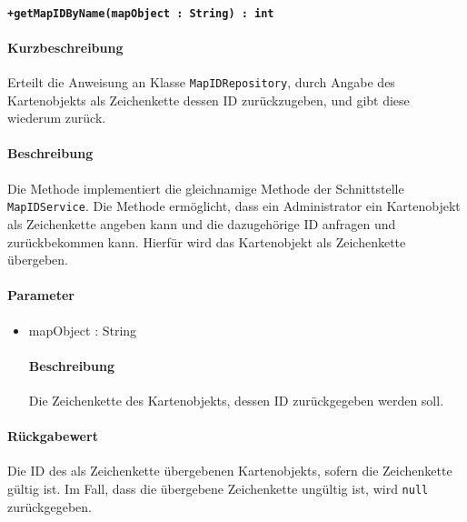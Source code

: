 \paragraph*{\texttt{+getMapIDByName(mapObject : String) : int}}%
\paragraph*{Kurzbeschreibung}
Erteilt die Anweisung an Klasse \texttt{MapIDRepository}, durch Angabe des Kartenobjekts als Zeichenkette dessen ID zurückzugeben, und gibt diese wiederum zurück.
\paragraph*{Beschreibung}
Die Methode implementiert die gleichnamige Methode der Schnittstelle \texttt{MapIDService}.
Die Methode ermöglicht, dass ein Administrator ein Kartenobjekt als Zeichenkette angeben kann und die dazugehörige ID anfragen und zurückbekommen kann.
Hierfür wird das Kartenobjekt als Zeichenkette übergeben.
\paragraph*{Parameter}
\begin{itemize}
    \item mapObject : String
    		\paragraph*{Beschreibung}
    		Die Zeichenkette des Kartenobjekts, dessen ID zurückgegeben werden soll.
\end{itemize}
\paragraph*{Rückgabewert}
Die ID des als Zeichenkette übergebenen Kartenobjekts, sofern die Zeichenkette gültig ist.
Im Fall, dass die übergebene Zeichenkette ungültig ist, wird \texttt{null} zurückgegeben.
